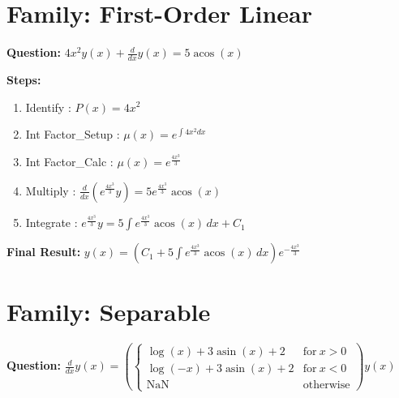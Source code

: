\documentclass{article}
\begin{document}
\section*{Family: First-Order Linear}
\textbf{Question:} $4 x^{2} y{\left(x \right)} + \frac{d}{d x} y{\left(x \right)} = 5 \operatorname{acos}{\left(x \right)}$

\textbf{Steps:}
\begin{enumerate}
\item Identify :  $P(x) = 4 x^{2}$
\item Int Factor_Setup :  $\mu(x) = e^{\int 4 x^{2} dx}$
\item Int Factor_Calc :  $\mu(x) = e^{\frac{4 x^{3}}{3}}$
\item Multiply :  $\frac{d}{dx}(e^{\frac{4 x^{3}}{3}}y) = 5 e^{\frac{4 x^{3}}{3}} \operatorname{acos}{\left(x \right)}$
\item Integrate :  $e^{\frac{4 x^{3}}{3}}y = 5 \int e^{\frac{4 x^{3}}{3}} \operatorname{acos}{\left(x \right)}\, dx + C_1$
\end{enumerate}
\textbf{Final Result:} $y{\left(x \right)} = \left(C_{1} + 5 \int e^{\frac{4 x^{3}}{3}} \operatorname{acos}{\left(x \right)}\, dx\right) e^{- \frac{4 x^{3}}{3}}$

\section*{Family: Separable}
\textbf{Question:} $\frac{d}{d x} y{\left(x \right)} = \left(\begin{cases} \log{\left(x \right)} + 3 \operatorname{asin}{\left(x \right)} + 2 & \text{for}\: x > 0 \\\log{\left(- x \right)} + 3 \operatorname{asin}{\left(x \right)} + 2 & \text{for}\: x < 0 \\\text{NaN} & \text{otherwise} \end{cases}\right) y{\left(x \right)}$
\end{document}
